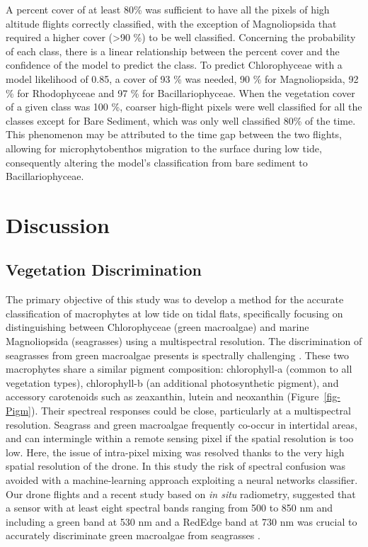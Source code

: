 \documentclass[
  number]{elsarticle}
\begin{document}
A percent cover of at least 80\% was sufficient to have all the pixels
of high altitude flights correctly classified, with the exception of
Magnoliopsida that required a higher cover (\textgreater90 \%) to be
well classified. Concerning the probability of each class, there is a
linear relationship between the percent cover and the confidence of the
model to predict the class. To predict Chlorophyceae with a model
likelihood of 0.85, a cover of 93 \% was needed, 90 \% for
Magnoliopsida, 92 \% for Rhodophyceae and 97 \% for Bacillariophyceae.
When the vegetation cover of a given class was 100 \%, coarser
high-flight pixels were well classified for all the classes except for
Bare Sediment, which was only well classified 80\% of the time. This
phenomenon may be attributed to the time gap between the two flights,
allowing for microphytobenthos migration to the surface during low tide,
consequently altering the model's classification from bare sediment to
Bacillariophyceae.

\section{Discussion}\label{discussion}

\subsection{Vegetation Discrimination}\label{vegetation-discrimination}

The primary objective of this study was to develop a method for the
accurate classification of macrophytes at low tide on tidal flats,
specifically focusing on distinguishing between Chlorophyceae (green
macroalgae) and marine Magnoliopsida (seagrasses) using a multispectral
resolution. The discrimination of seagrasses from green macroalgae
presents is spectrally challenging \citetext{\citealp[
]{oiry2021using}; \citealp[
]{bannari2022}; \citealp{veettil2020opportunities}}. These two
macrophytes share a similar pigment composition: chlorophyll-a (common
to all vegetation types), chlorophyll-b (an additional photosynthetic
pigment), and accessory carotenoids such as zeaxanthin, lutein and
neoxanthin (Figure~\ref{fig-Pigm}). Their spectreal responses could be
close, particularly at a multispectral resolution. Seagrass and green
macroalgae frequently co-occur in intertidal areas, and can intermingle
within a remote sensing pixel if the spatial resolution is too low.
Here, the issue of intra-pixel mixing was resolved thanks to the very
high spatial resolution of the drone. In this study the risk of spectral
confusion was avoided with a machine-learning approach exploiting a
neural networks classifier. Our drone flights and a recent study based
on \emph{in situ} radiometry, suggested that a sensor with at least
eight spectral bands ranging from 500 to 850 nm and including a green
band at 530 nm and a RedEdge band at 730 nm was crucial to accurately
discriminate green macroalgae from seagrasses \citep{Davies2023}.
\end{document}
